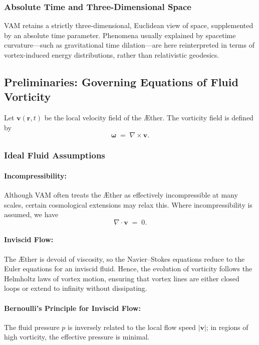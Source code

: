 \documentclass[aps,preprint,superscriptaddress]{revtex4-2}
\begin{document}
    \subsubsection{Absolute Time and Three-Dimensional Space}
    VAM retains a strictly three-dimensional, Euclidean view of space, supplemented by an absolute time parameter. Phenomena usually explained by spacetime curvature—such as gravitational time dilation—are here reinterpreted in terms of vortex-induced energy distributions, rather than relativistic geodesics.

    \subsection{Preliminaries: Governing Equations of Fluid Vorticity}
    Let \(\mathbf{v}(\mathbf{r},t)\) be the local velocity field of the Æther. The vorticity field is defined by
    \[
        \boldsymbol{\omega} \;=\; \nabla \times \mathbf{v}.
    \]

    \subsubsection{Ideal Fluid Assumptions}
    \paragraph{Incompressibility:}
    Although VAM often treats the Æther as effectively incompressible at many scales, certain cosmological extensions may relax this. Where incompressibility is assumed, we have
    \[
        \nabla \cdot \mathbf{v} \;=\; 0.
    \]

    \paragraph{Inviscid Flow:}
    The Æther is devoid of viscosity, so the Navier–Stokes equations reduce to the Euler equations for an inviscid fluid. Hence, the evolution of vorticity follows the Helmholtz laws of vortex motion, ensuring that vortex lines are either closed loops or extend to infinity without dissipating.

    \paragraph{Bernoulli’s Principle for Inviscid Flow:}
    The fluid pressure \(p\) is inversely related to the local flow speed \(\lvert \mathbf{v} \rvert\); in regions of high vorticity, the effective pressure is minimal.
\end{document}
